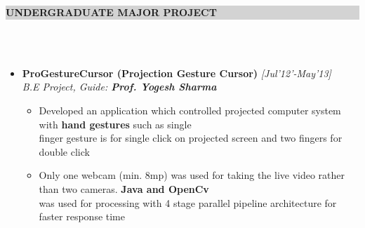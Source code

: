 \documentclass[a4paper,10pt]{article}
\newcommand{\hsep}{-0.6cm}
\newcommand{\resheading}[1]{{\small \colorbox{lightgray}{\begin{minipage}{1\textwidth}{\textbf{#1 \vphantom{p\^{E}}}}\end{minipage}}}}
\begin{document}
\hspace{-0.5cm}
\resheading{\textbf{\large UNDERGRADUATE MAJOR PROJECT   }} \\[\hsep]
\\[-0.3cm]
\begin{itemize}
    \item \textbf{ProGestureCursor (Projection Gesture Cursor)}  \hfill\emph{[Jul'12'-May'13]} \\
    \emph{B.E Project, Guide: \textbf{Prof. Yogesh Sharma}} \\[\hsep]
        \begin{itemize}
	        \item Developed an application which controlled projected computer system with \textbf{hand gestures} such as single\\[-0.05cm] finger gesture is for single click on projected screen and two fingers for double click\\[-0.55cm] 
	        \item Only one webcam (min. 8mp) was used for taking the live video rather than two cameras. \textbf{Java and OpenCv}\\[-0.05cm] was used for processing with 4 stage parallel pipeline architecture for faster response time\\[-0.55cm] 
        \end{itemize}
\end{itemize}
\end{document}
